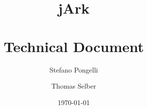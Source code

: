 \documentclass{report}
\begin{document}
\title{\Huge jArk\\~\\\large Technical Document \normalsize}
\author{Stefano Pongelli \and Thomas Selber}
\date{\today}
\maketitle
\tableofcontents






\end{document}
